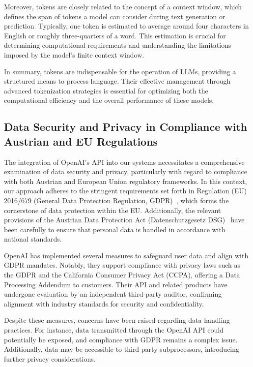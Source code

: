 Moreover, tokens are closely related to the concept of a context window, which defines the span of tokens a model can consider during text generation or prediction. 
Typically, one token is estimated to average around four characters in English or roughly three-quarters of a word. 
This estimation is crucial for determining computational requirements and understanding the limitations imposed by the model’s finite context window.

In summary, tokens are indispensable for the operation of LLMs, providing a structured means to process language. 
Their effective management through advanced tokenization strategies is essential for optimizing both the computational efficiency and the overall performance 
of these models.

\cite{understanding-tokens-context-window-llms}


\subsection{Data Security and Privacy in Compliance with Austrian and EU Regulations}
\label{sec:data-security-privacy-openai}

The integration of OpenAI's API into our systems necessitates a comprehensive examination of data security and privacy, 
particularly with regard to compliance with both Austrian and European Union regulatory frameworks. 
In this context, our approach adheres to the stringent requirements set forth in Regulation (EU) 2016/679
(General Data Protection Regulation, GDPR) \cite{EU2016GDPR}, which forms the cornerstone of data protection within the EU. Additionally,
the relevant provisions of the Austrian Data Protection Act (Datenschutzgesetz DSG) \cite{AustrianDSG} have been carefully 
to ensure that personal data is handled in accordance with national standards.

OpenAI has implemented several measures to safeguard user data and align with GDPR mandates. 
Notably, they support compliance with privacy laws such as the GDPR and the California Consumer Privacy Act (CCPA), 
offering a Data Processing Addendum to customers. Their API and related products have undergone evaluation by an independent third-party auditor, 
confirming alignment with industry standards for security and confidentiality. 

\cite{OpenAI-Data-Residency-Europe}

Despite these measures, concerns have been raised regarding data handling practices. 
For instance, data transmitted through the OpenAI API could potentially be exposed, and compliance with GDPR remains a complex issue. Additionally, 
data may be accessible to third-party subprocessors, introducing further privacy considerations.

